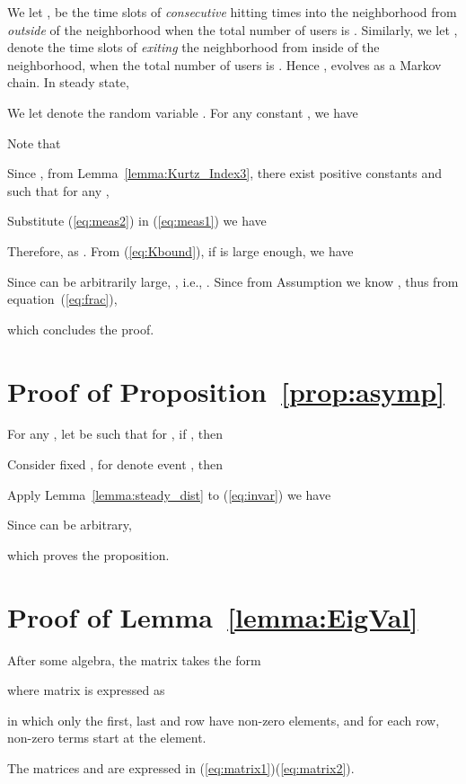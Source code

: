 \documentclass[11pt,twocolumn]{IEEEtran}
\begin{document}
We let ,  be the time slots of \emph{consecutive} hitting times into the neighborhood  from \emph{outside} of the neighborhood when the total number of users is . Similarly, we let ,  denote the time slots of \emph{exiting} the
neighborhood  from inside of the neighborhood, when the total number of users is . Hence ,  evolves as a Markov chain. In steady state,




We let  denote the random variable . For any constant , we have


Note that


Since , from Lemma~\ref{lemma:Kurtz_Index3}, there exist positive constants  and  such that for any ,


Substitute (\ref{eq:meas2}) in (\ref{eq:meas1}) we have


Therefore,  as . From (\ref{eq:Kbound}), if  is large enough, we have


Since  can be arbitrarily large, , i.e., . Since from Assumption  we know , thus from equation~(\ref{eq:frac}),

which concludes the proof.

\section{Proof of Proposition~\ref{prop:asymp}}
\label{appen:global}

For any , let  be such that for , if , then


Consider fixed , for  denote event , then


Apply Lemma~\ref{lemma:steady_dist} to (\ref{eq:invar}) we have


Since  can be arbitrary,

which proves the proposition.

\section{Proof of Lemma~\ref{lemma:EigVal}}
\label{appen:EigVal}

After some algebra, the matrix  takes the form

where matrix  is expressed as

in which only the first, last and  row have non-zero elements, and for each row, non-zero terms start at the  element.

The matrices  and  are expressed in (\ref{eq:matrix1})(\ref{eq:matrix2}).

\begin{figure*}[hb]
\hrulefill


\vspace{-0.2in}
\end{figure*}
\end{document}
